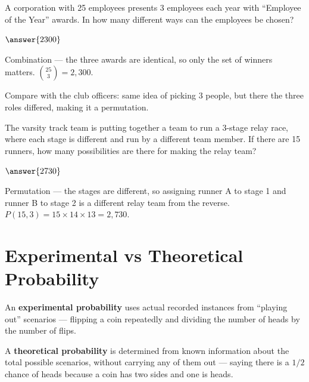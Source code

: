 \documentclass[12pt]{ximera}
\begin{document}
\begin{problem}
A corporation with 25 employees presents 3 employees each year with ``Employee of the
Year'' awards. In how many different ways can the employees be chosen?
\begin{multipleChoice}
\end{multipleChoice}

$\answer{2300}$

\begin{solution}
Combination --- the three awards are identical, so only the set of winners matters.
$\binom{25}{3} = 2{,}300$.

Compare with the club officers: same idea of picking 3 people, but there the three roles
differed, making it a permutation.
\end{solution}
\end{problem}

\begin{problem}
The varsity track team is putting together a team to run a 3-stage relay race, where each
stage is different and run by a different team member. If there are 15 runners, how many
possibilities are there for making the relay team?
\begin{multipleChoice}
\end{multipleChoice}

$\answer{2730}$

\begin{solution}
Permutation --- the stages are different, so assigning runner A to stage 1 and runner B to
stage 2 is a different relay team from the reverse. $P(15,3) = 15 \times 14 \times 13 =
2{,}730$.
\end{solution}
\end{problem}

\section*{Experimental vs Theoretical Probability}

An \textbf{experimental probability} uses actual recorded instances from ``playing out''
scenarios --- flipping a coin repeatedly and dividing the number of heads by the number
of flips.

A \textbf{theoretical probability} is determined from known information about the total
possible scenarios, without carrying any of them out --- saying there is a $1/2$ chance of
heads because a coin has two sides and one is heads.
\end{document}
